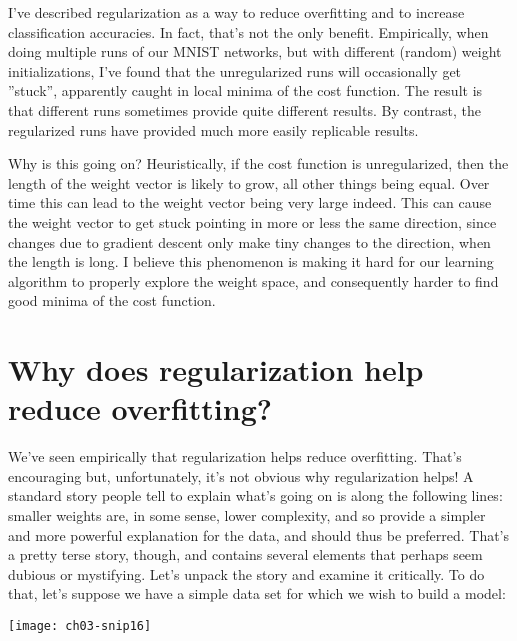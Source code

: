 I've described regularization as a way to reduce overfitting and to increase classification accuracies. In fact, that's not the only benefit. Empirically, when doing multiple runs of our MNIST networks, but with different (random) weight initializations, I've found that the unregularized runs will occasionally get ''stuck'', apparently caught in local minima of the cost function. The result is that different runs sometimes provide quite different results. By contrast, the regularized runs have provided much more easily replicable results.

Why is this going on? Heuristically, if the cost function is unregularized, then the length of the weight vector is likely to grow, all other things being equal. Over time this can lead to the weight vector being very large indeed. This can cause the weight vector to get stuck pointing in more or less the same direction, since changes due to gradient descent only make tiny changes to the direction, when the length is long. I believe this phenomenon is making it hard for our learning algorithm to properly explore the weight space, and consequently harder to find good minima of the cost function.

\section{Why does regularization help reduce overfitting?}

We've seen empirically that regularization helps reduce overfitting. That's encouraging but, unfortunately, it's not obvious why regularization helps! A standard story people tell to explain what's going on is along the following lines: smaller weights are, in some sense, lower complexity, and so provide a simpler and more powerful explanation for the data, and should thus be preferred. That's a pretty terse story, though, and contains several elements that perhaps seem dubious or mystifying. Let's unpack the story and examine it critically. To do that, let's suppose we have a simple data set for which we wish to build a model:
\begin{marginfigure}
\texttt{[image: ch03-snip16]}
\end{marginfigure}

